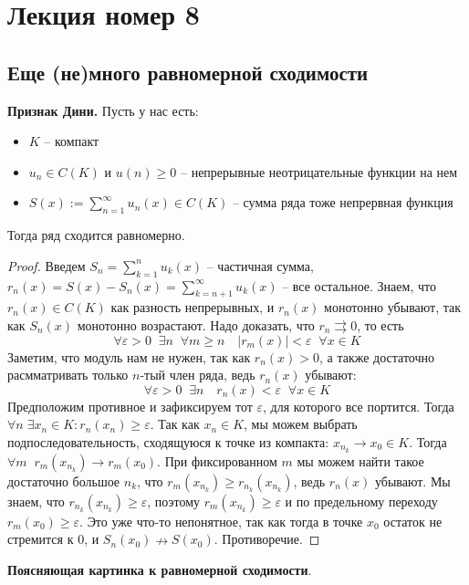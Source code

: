 \section{Лекция номер 8}
\subsection{Еще (не)много равномерной сходимости}

\textbf{Признак Дини.} 
Пусть у нас есть:
\begin{itemize}
    \item $K$ -- компакт
    \item $u_n \in C(K)$ и $u(n) \geqslant 0$ -- непрерывные неотрицательные функции на нем
    \item $S(x) := \sum\limits_{n = 1}^\infty u_n(x) \in C(K)$ -- сумма ряда тоже непрервная функция
\end{itemize}
Тогда ряд сходится равномерно.
\begin{proof}
    Введем $S_n = \sum\limits_{k = 1}^n u_k(x)$ -- частичная сумма, $r_n(x) = S(x) - S_n(x) = \sum\limits_{k = n+1}^\infty u_k(x)$ -- все остальное.
    Знаем, что $r_n(x) \in C(K)$ как разность непрерывных, и $r_n(x)$ монотонно убывают, так как $S_n(x)$ монотонно возрастают.
    Надо доказать, что $r_n \rightrightarrows 0$, то есть \[ \forall \varepsilon > 0  \;\; \exists n \;\; \forall m \geqslant n \quad |r_m(x)| < \varepsilon \;\; \forall x \in K \]
    Заметим, что модуль нам не нужен, так как $r_n(x) > 0$, а также достаточно расмматривать только $n$-тый член ряда, ведь $r_n(x)$ убывают:
    \[ \forall \varepsilon > 0  \;\; \exists n \quad r_n(x) < \varepsilon \;\; \forall x \in K \]
    Предположим противное и зафиксируем тот $\varepsilon$, для которого все портится.
    Тогда $\forall n \; \exists x_n \in K : r_n(x_n) \geqslant \varepsilon$. 
    Так как $x_n \in K$, мы можем выбрать подпоследовательность, сходящуюся к точке из компакта: $x_{n_k} \to x_0 \in K$.
    Тогда $\forall m \;\; r_m(x_{n_k}) \to r_m(x_0)$. 
    При фиксированном $m$ мы можем найти такое достаточно большое $n_k$, что $r_m(x_{n_k}) \geqslant r_{n_k}(x_{n_k})$, ведь $r_n(x)$ убывают.
    Мы знаем, что $r_{n_k}(x_{n_k}) \geqslant \varepsilon$, поэтому $r_m(x_{n_k}) \geqslant \varepsilon$ и по предельному переходу $r_m(x_0) \geqslant \varepsilon$.
    Это уже что-то непонятное, так как тогда в точке $x_0$ остаток не стремится к 0, и $S_n(x_0) \nrightarrow S(x_0)$. Противоречие. 
\end{proof}

\textbf{Поясняющая картинка к равномерной сходимости}.

